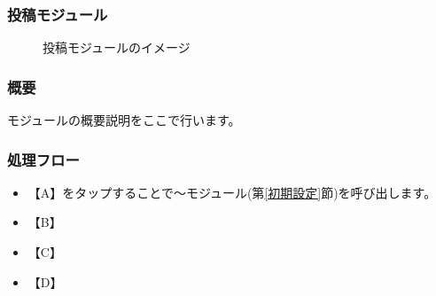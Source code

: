 \documentclass[a4j]{jarticle}
\begin{document}
\subsubsection{投稿モジュール\label{投稿}} %
\begin{figure}[H]
    \begin{center}
    \caption {投稿モジュールのイメージ}
    \label{functionselection}
    \end{center}
\end{figure}
\subsubsection*{概要}
モジュールの概要説明をここで行います。
\subsubsection*{処理フロー}
\begin{itemize}
\item 【A】をタップすることで～モジュール(第\ref{初期設定}節)を呼び出します。%
\item 【B】
\item 【C】
\item 【D】
\end{itemize}
\end{document}
